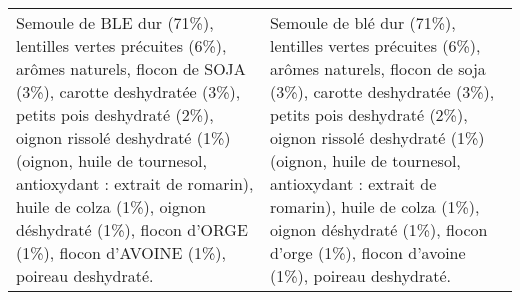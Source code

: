 \begin{tabular}{p{7cm}p{7cm}}
                                                                                                                                                                                                                                                                                                                                                                                                                                                                                                                                                                                                                                                                                                                                                                                                                                                                                                                                                                                                                                                                                                                                                                                                                                                                                                                                                   Semoule de BLE dur (71\%), lentilles vertes précuites (6\%), arômes naturels, flocon de SOJA (3\%), carotte deshydratée (3\%), petits pois deshydraté (2\%), oignon rissolé deshydraté (1\%) (oignon, huile de tournesol, antioxydant : extrait de romarin), huile de colza (1\%), oignon déshydraté (1\%), flocon d'ORGE (1\%), flocon d'AVOINE (1\%), poireau deshydraté. &                                                                                                                                                                                            Semoule de blé dur (71\%), lentilles vertes précuites (6\%), arômes naturels, flocon de soja (3\%), carotte deshydratée (3\%), petits pois deshydraté (2\%), oignon rissolé deshydraté (1\%) (oignon, huile de tournesol, antioxydant : extrait de romarin), huile de colza (1\%), oignon déshydraté (1\%), flocon d'orge (1\%), flocon d'avoine (1\%), poireau deshydraté. \\

\end{tabular}
